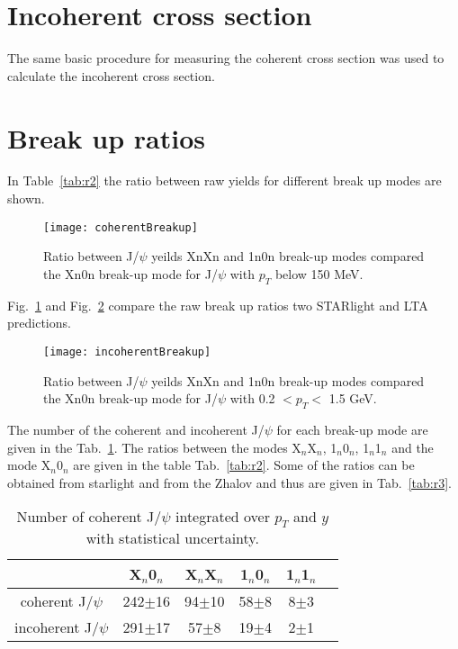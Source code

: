 \iffalse
  \section{Incoherent cross section}
  The same basic procedure for measuring the coherent cross section was used to 
    calculate the incoherent cross section.  
  \section{Break up ratios}
    In Table~\ref{tab:r2} the ratio between raw yields for different break up 
      modes are shown.
    \begin{figure}[!Hhtb]
      \centering
      \texttt{[image: coherentBreakup]}
      \caption{Ratio between J/$\psi$ yeilds XnXn and 1n0n break-up modes 
        compared the Xn0n break-up mode for J/$\psi$ with $p_{T}$ below 150 
        MeV.}
      \label{fig:coherentBreakUp}
    \end{figure}
   
    Fig.~\ref{fig:coherentBreakUp} and Fig.~\ref{fig:incoherentBreakUp} compare
      the raw break up ratios two STARlight and LTA predictions. 
    \begin{figure}[!Hhtb]
      \centering
      \texttt{[image: incoherentBreakup]}
      \caption{Ratio between J/$\psi$ yeilds XnXn and 1n0n break-up modes 
        compared the Xn0n break-up mode for J/$\psi$ with 0.2 $< p_{T} <$ 
        1.5 GeV.}
      \label{fig:incoherentBreakUp}
    \end{figure}

    The number of the coherent and incoherent J/$\psi$ for each break-up mode are
      given in the Tab.~\ref{tab:r1}. 
    The ratios between the modes X$_{n}$X$_{n}$, 1$_{n}$0$_{n}$, 1$_{n}$1$_{n}$ and
      the mode  X$_{n}$0$_{n}$ are given in the table Tab.~\ref{tab:r2}. 
    Some of the  ratios can be obtained from  {\sc starlight} and from the Zhalov 
      and thus are given in Tab.~\ref{tab:r3}.
    \begin{table}[h]
      \begin{center}
      \begin{tabular}{|c|c|c|c|c|c|}
        \hline
         &  X$_{n}$0$_{n}$& X$_{n}$X$_{n}$ & 1$_{n}$0$_{n}$ & 1$_{n}$1$_{n}$  \\ \hline
        coherent J/$\psi$ &  242$\pm$16&94$\pm$10&58$\pm$8&8$\pm$3\\ \hline
        incoherent J/$\psi$ & 291$\pm$17&57$\pm$8&19$\pm$4&2$\pm$1\\ \hline
      \end{tabular}
      \caption{\label{tab:r1} Number of coherent J/$\psi$ integrated over $p_{T}$ and $y$ 
        with statistical uncertainty.}
      \end{center}
    \end{table}
    
